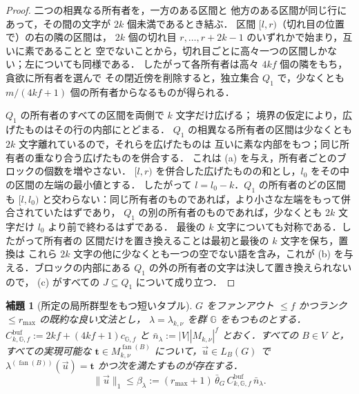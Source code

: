 \documentclass[11pt,a4paper]{ltjsarticle}
\numberwithin{equation}{section}
\theoremstyle{plain}
\newtheorem{lemma}[theorem]{補題}
\theoremstyle{definition}
\theoremstyle{remark}
\newcommand{\tuple}[1]{\vec{#1}}
\newcommand{\fan}{\operatorname{fan}}
\theoremstyle{plain}
\begin{document}
\begin{proof}
二つの相異なる所有者を，一方のある区間と
他方のある区間が同じ行にあって，その間の文字が $2k$ 個未満であるとき結ぶ．
区間 $[l,r)$（切れ目の位置で）の右の隣の区間は，
$2k$ 個の切れ目 $r,\ldots,r+2k-1$ のいずれかで始まり，互いに素であることと
空でないことから，切れ目ごとに高々一つの区間しかない；左についても同様である．
したがって各所有者は高々 $4kf$ 個の隣をもち，貪欲に所有者を選んで
その閉近傍を削除すると，独立集合 $Q_1$ で，少なくとも
$m/(4kf+1)$ 個の所有者からなるものが得られる．

$Q_1$ の所有者のすべての区間を両側で $k$ 文字だけ広げる；
境界の仮定により，広げたものはその行の内部にとどまる．
$Q_1$ の相異なる所有者の区間は少なくとも $2k$ 文字離れているので，それらを広げたものは
互いに素な内部をもつ；同じ所有者の重なり合う広げたものを併合する．
これは (a) を与え，所有者ごとのブロックの個数を増やさない．
$[l,r)$ を併合した広げたものの和とし，$l_0$ をその中の区間の左端の最小値とする．
したがって $l=l_0-k$．$Q_1$ の所有者のどの区間も
$[l,l_0)$ と交わらない：同じ所有者のものであれば，より小さな左端をもって併合されていたはずであり，
$Q_1$ の別の所有者のものであれば，少なくとも $2k$ 文字だけ $l_0$ より前で終わるはずである．
最後の $k$ 文字についても対称である．したがって所有者の
区間だけを置き換えることは最初と最後の $k$ 文字を保ち，置換は
これら $2k$ 文字の他に少なくとも一つの空でない語を含み，これが
(b) を与える．ブロックの内部にある $Q_1$ の外の所有者の文字は決して置き換えられないので，
(c) がすべての $J\subseteq Q_1$ について成り立つ．
\end{proof}

\begin{lemma}[所定の局所群型をもつ短いタプル]
\label{lem:local-group-shortest}
$G$ をファンアウト $\le f$ かつランク $\le r_{\max}$ の既約な良い文法とし，
$\lambda=\lambda_{k,\nu}$ を群 ${\mathbb G}$ をもつものとする．
$C^{\mathrm{buf}}_{k,{\mathbb G},f}:=2kf+(4kf+1)c_{{\mathbb G},f}$ と
$\bar n_\lambda:=|V||M_{k,\nu}|^f$ とおく．すべての $B\in V$ と，すべての実現可能な
$\mathbf t\in M_{k,\nu}^{\fan(B)}$ について，$\tuple u\in L_B(G)$ で
$\lambda^{(\fan(B))}(\tuple u)=\mathbf t$ かつ次を満たすものが存在する．
\[
 \|\tuple u\|_1\le\beta_\lambda:=(r_{\max}+1)\,\bar\theta_G\,
 C^{\mathrm{buf}}_{k,{\mathbb G},f}\,\bar n_\lambda .
\]
\end{lemma}
\end{document}
